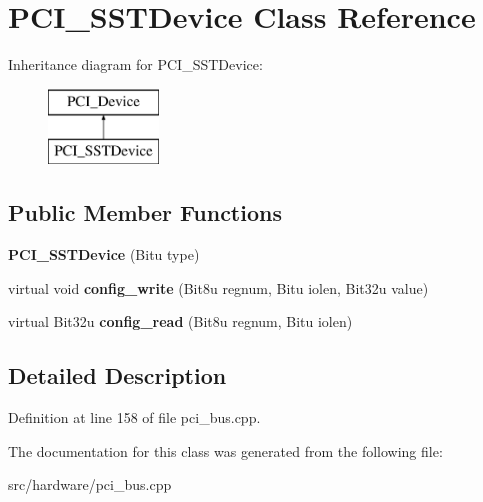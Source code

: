 \hypertarget{classPCI__SSTDevice}{\section{P\-C\-I\-\_\-\-S\-S\-T\-Device Class Reference}
\label{classPCI__SSTDevice}
}
Inheritance diagram for P\-C\-I\-\_\-\-S\-S\-T\-Device\-:\begin{figure}[H]
\begin{center}
\leavevmode
\includegraphics[height=2.000000cm]{classPCI__SSTDevice}
\end{center}
\end{figure}
\subsection*{Public Member Functions}
\begin{DoxyCompactItemize}
\item 
\hypertarget{classPCI__SSTDevice_a54b4296972afb04dbae524134bd15ddd}{{\bfseries P\-C\-I\-\_\-\-S\-S\-T\-Device} (Bitu type)}\label{classPCI__SSTDevice_a54b4296972afb04dbae524134bd15ddd}

\item 
\hypertarget{classPCI__SSTDevice_a10b8507ff365b24457f76327b9a66cc8}{virtual void {\bfseries config\-\_\-write} (Bit8u regnum, Bitu iolen, Bit32u value)}\label{classPCI__SSTDevice_a10b8507ff365b24457f76327b9a66cc8}

\item 
\hypertarget{classPCI__SSTDevice_a6f5475387ebdf2f3baa4db69b8ccd992}{virtual Bit32u {\bfseries config\-\_\-read} (Bit8u regnum, Bitu iolen)}\label{classPCI__SSTDevice_a6f5475387ebdf2f3baa4db69b8ccd992}

\end{DoxyCompactItemize}


\subsection{Detailed Description}


Definition at line 158 of file pci\-\_\-bus.\-cpp.



The documentation for this class was generated from the following file\-:\begin{DoxyCompactItemize}
\item 
src/hardware/pci\-\_\-bus.\-cpp\end{DoxyCompactItemize}
